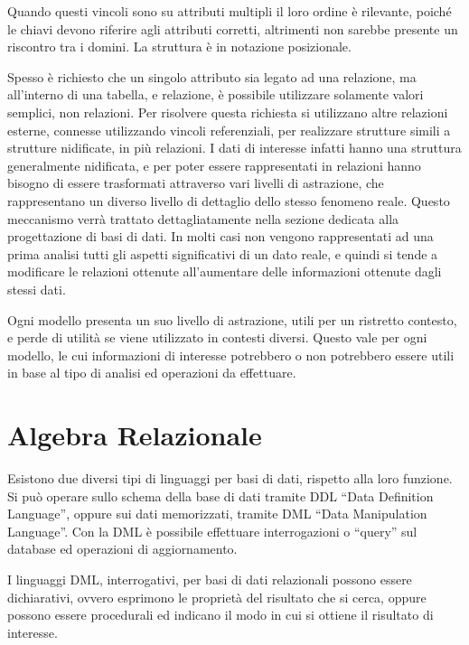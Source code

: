 \documentclass{article}
\numberwithin{equation}{subsection}
\begin{document}
Quando questi vincoli sono su attributi multipli il loro ordine è rilevante, poiché le chiavi devono riferire agli attributi corretti, altrimenti non sarebbe presente un riscontro tra i domini. La struttura è in 
notazione posizionale. 

Spesso è richiesto che un singolo attributo sia legato ad una relazione, ma all'interno di una tabella, e relazione, è possibile utilizzare solamente valori semplici, non relazioni. 
Per risolvere questa richiesta si utilizzano altre relazioni esterne, connesse utilizzando vincoli referenziali, per realizzare strutture simili a strutture nidificate, in più relazioni. I dati di interesse 
infatti hanno una struttura generalmente nidificata, e per poter essere rappresentati in relazioni hanno bisogno di essere trasformati attraverso vari livelli di astrazione, che rappresentano un diverso livello 
di dettaglio dello stesso fenomeno reale. 
Questo meccanismo verrà trattato dettagliatamente nella sezione dedicata alla progettazione di basi di dati. In molti casi non vengono rappresentati ad una prima analisi tutti gli aspetti significativi di un 
dato reale, e quindi si tende a modificare le relazioni ottenute all'aumentare delle informazioni ottenute dagli stessi dati. 

Ogni modello presenta un suo livello di astrazione, utili per un ristretto contesto, e perde di utilità se viene utilizzato in contesti diversi. Questo vale per ogni modello, le cui informazioni di interesse potrebbero 
o non potrebbero essere utili in base al tipo di analisi ed operazioni da effettuare. 


\clearpage

\section{Algebra Relazionale}


Esistono due diversi tipi di linguaggi per basi di dati, rispetto alla loro funzione. Si può operare sullo schema della base di dati tramite DDL ``Data Definition Language'', oppure sui dati 
memorizzati, tramite DML ``Data Manipulation Language''. Con la DML è possibile effettuare interrogazioni o ``query'' sul database ed operazioni di aggiornamento.

I linguaggi DML, interrogativi, per basi di dati relazionali possono essere dichiarativi, ovvero esprimono le proprietà del risultato che si cerca, oppure possono essere procedurali ed indicano il modo in cui 
si ottiene il risultato di interesse. 
\end{document}
